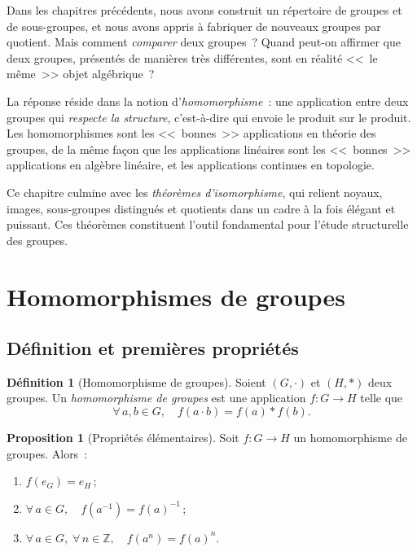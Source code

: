 \documentclass[12pt,a4paper,openany]{book}
\theoremstyle{definition}
\newtheorem{definition}{Définition}[chapter]
\newtheorem{proposition}{Proposition}[chapter]
\newcommand{\Z}{\mathbb{Z}}
\begin{document}
Dans les chapitres précédents, nous avons construit un répertoire de
groupes et de sous-groupes, et nous avons appris à fabriquer de nouveaux
groupes par quotient. Mais comment \emph{comparer} deux groupes~? Quand
peut-on affirmer que deux groupes, présentés de manières très
différentes, sont en réalité <<~le même~>> objet algébrique~?

\medskip

La réponse réside dans la notion d'\emph{homomorphisme}~:
une application entre deux groupes qui \emph{respecte la structure}, c'est-à-dire
qui envoie le produit sur le produit. Les homomorphismes sont les <<~bonnes~>>
applications en théorie des groupes, de la même façon que les applications
linéaires sont les <<~bonnes~>> applications en algèbre linéaire, et les
applications continues en topologie.

\medskip

Ce chapitre culmine avec les \emph{théorèmes d'isomorphisme}, qui
relient noyaux, images, sous-groupes distingués et quotients dans un
cadre à la fois élégant et puissant. Ces théorèmes constituent l'outil
fondamental pour l'étude structurelle des groupes.

\section{Homomorphismes de groupes}\label{sec:homomorphismes}

\subsection{Définition et premières propriétés}\label{subsec:hom-def}

\begin{definition}[Homomorphisme de groupes]\label{def:homomorphisme}
  Soient $(G,\cdot)$ et $(H,\ast)$ deux groupes. Un
  \emph{homomorphisme de groupes}
  est une application $f\colon G\to H$ telle que
  \[
    \forall\, a,b\in G,\quad f(a\cdot b) = f(a)\ast f(b).
  \]
\end{definition}

\begin{proposition}[Propriétés élémentaires]\label{prop:hom-proprietes}
  Soit $f\colon G\to H$ un homomorphisme de groupes. Alors~:
  \begin{enumerate}[label=(\roman*)]
    \item $f(e_G) = e_H$\,;
    \item $\forall\, a\in G,\quad f(a^{-1}) = f(a)^{-1}$\,;
    \item $\forall\, a\in G,\;\forall\, n\in\Z,\quad f(a^n) = f(a)^n$.
  \end{enumerate}
\end{proposition}
\end{document}
